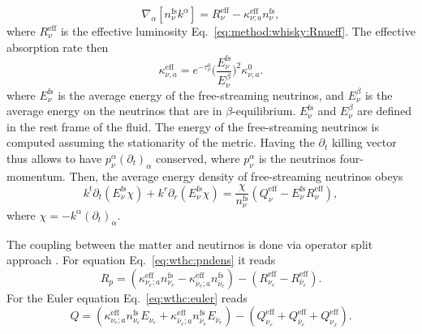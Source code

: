 \begin{equation}
\label{eq:method:whisky:eq7}
\nabla_{\alpha}[n_{\nu}^{\text{fs}}k^{\alpha}] = R_{\nu}^{\text{eff}} - \kappa_{\nu;a}^{\text{eff}}n_{\nu}^{\text{fs}},
\end{equation}
%
where $R_{\nu}^{\text{eff}}$ is the effective luminosity Eq.~\eqref{eq:method:whisky:Rnueff}. 
%
The effective absorption rate then
%
\begin{equation}
\kappa_{\nu,a}^{\text{eff}} = e^{-\tau_{\nu}^0}\Big( \frac{E_{\nu}^{\text{fs}}}{E_{\nu}^{\beta}} \Big)^2 \kappa_{\nu,a}^0.
\end{equation}
%
where $E_{\nu}^{\text{fs}}$ is the average energy of the free-streaming neutrinos, and 
$E_{\nu}^{\beta}$ is the average energy on the neutrinos that are in $\beta$-equilibrium.
$E_{\nu}^{\text{fs}}$ and $E_{\nu}^{\beta}$ are defined in the rest frame of the fluid.
%
The energy of the free-streaming neutrinos is computed assuming the stationarity of the metric.
Having the $\partial_t$ killing vector thus allows to have $p_{\nu}^{\alpha}(\partial_t)_{\alpha}$ conserved, 
where $p_{\nu}^{\alpha}$ is the neutrinos four-momentum.
%
Then, the average energy density of free-streaming neutrinos obeys
%
\begin{equation}
\label{eq:method:whisky:eq9}
k^t\partial_t(E_{\nu}^{\text{fs}}\chi) + k^{r}\partial_r(E_{\nu}^{\text{fs}}\chi) = \frac{\chi}{n_{\nu}^{\text{fs}}}(Q_{\nu}^{\text{eff}}-E_{\nu}^{\text{fs}}R_{\nu}^{\text{eff}}),
\end{equation}
%
where $\chi=-k^{\alpha}(\partial_t)_{\alpha}$.



The coupling between the matter and neutirnos is done 
via operator split approach \cite{Radice:2016dwd}.
For equation Eq.~\eqref{eq:wthc:pndens} it reads
%
\begin{equation}
R_p = (\kappa_{\nu_e;a}^{\text{eff}}n_{\nu_e}^{\text{fs}} - \kappa_{\bar{\nu}_e;a}^{\text{eff}}n_{\bar{\nu}_e}^{\text{fs}}) - (R_{\nu_e}^{\text{eff}} - R_{\bar{\nu}_e}^{\text{eff}}).
\end{equation}
%
For the Euler equation Eq.~\eqref{eq:wthc:euler} reads
%
\begin{equation}
Q = (\kappa_{\nu_e;a}^{\text{eff}}n_{\nu_e}^{\text{fs}}E_{\nu_e} + 
\kappa_{\bar{\nu}_e;a}^{\text{eff}}n_{\bar{\nu}_e}^{\text{fs}}E_{\bar{\nu}_e}) - 
(Q_{\nu_e}^{\text{eff}} + Q_{\bar{\nu}_e}^{\text{eff}} + Q_{\nu_x}^{\text{eff}}).
\end{equation}

